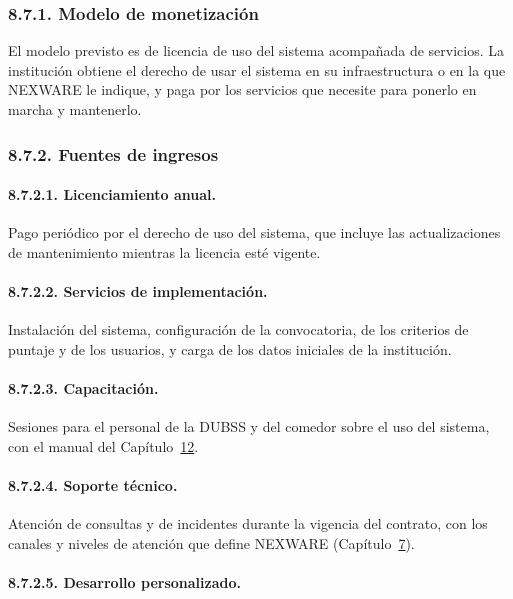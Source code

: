 \subsubsection{8.7.1. Modelo de monetización}

El modelo previsto es de licencia de uso del sistema acompañada de servicios. La institución obtiene el derecho de usar el sistema en su infraestructura o en la que NEXWARE le indique, y paga por los servicios que necesite para ponerlo en marcha y mantenerlo.

\subsubsection{8.7.2. Fuentes de ingresos}

\paragraph{8.7.2.1. Licenciamiento anual.}

Pago periódico por el derecho de uso del sistema, que incluye las actualizaciones de mantenimiento mientras la licencia esté vigente.

\paragraph{8.7.2.2. Servicios de implementación.}

Instalación del sistema, configuración de la convocatoria, de los criterios de puntaje y de los usuarios, y carga de los datos iniciales de la institución.

\paragraph{8.7.2.3. Capacitación.}

Sesiones para el personal de la DUBSS y del comedor sobre el uso del sistema, con el manual del Capítulo~\hyperref[cap:producto]{12}.

\paragraph{8.7.2.4. Soporte técnico.}

Atención de consultas y de incidentes durante la vigencia del contrato, con los canales y niveles de atención que define NEXWARE (Capítulo~\hyperref[cap:sitio_web]{7}).

\paragraph{8.7.2.5. Desarrollo personalizado.}

